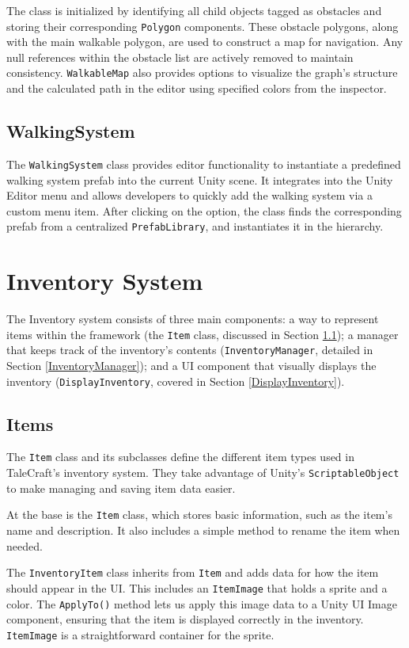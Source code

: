 The class is initialized by identifying all child objects tagged as obstacles and storing their corresponding \verb|Polygon| components. These obstacle polygons, along with the main walkable polygon, are used to construct a map for navigation. Any null references within the obstacle list are actively removed to maintain consistency. \verb|WalkableMap| also provides options to visualize the graph's structure and the calculated path in the editor using specified colors from the inspector.

\subsection{WalkingSystem}
The \verb|WalkingSystem| class provides editor functionality to instantiate a predefined walking system prefab into the current Unity scene. It integrates into the Unity Editor menu and allows developers to quickly add the walking system via a custom menu item. After clicking on the option, the class finds the corresponding prefab from a centralized \verb|PrefabLibrary|, and instantiates it in the hierarchy.


\section{Inventory System}
\label{InventorySystem}
The Inventory system consists of three main components: a way to represent items within the framework (the \verb|Item| class, discussed in Section \ref{Items}); a manager that keeps track of the inventory’s contents (\verb|InventoryManager|, detailed in Section \ref{InventoryManager}); and a UI component that visually displays the inventory (\verb|DisplayInventory|, covered in Section \ref{DisplayInventory}). 

\subsection{Items}
\label{Items}
The \verb|Item| class and its subclasses define the different item types used in TaleCraft’s inventory system. They take advantage of Unity’s \verb|ScriptableObject| to make managing and saving item data easier.

At the base is the \verb|Item| class, which stores basic information, such as the item’s name and description. It also includes a simple method to rename the item when needed.

The \verb|InventoryItem| class inherits from \verb|Item| and adds data for how the item should appear in the UI. This includes an \verb|ItemImage| that holds a sprite and a color. The \verb|ApplyTo()| method lets us apply this image data to a Unity UI Image component, ensuring that the item is displayed correctly in the inventory. \verb|ItemImage| is a straightforward container for the sprite.

